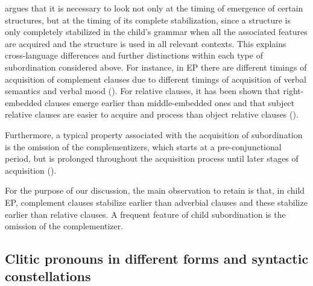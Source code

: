 \documentclass[output=paper]{langscibook}
\begin{document}
\citet{Armon-Lotem2005} argues that it is necessary to look not only at the timing of emergence of certain structures, but at the timing of its complete stabilization, since a structure is only completely stabilized in the child's grammar when all the associated features are acquired and the structure is used in all relevant contexts. This explains cross-language differences and further distinctions within each type of subordination considered above. For instance, in EP there are different timings of acquisition of complement clauses due to different timings of acquisition of verbal semantics and verbal mood (\citealt{JesusSantos2019}). For relative clauses, it has been shown that right-embedded clauses emerge earlier than middle-embedded ones \citep{Vasconcelos1995} and that subject relative clauses are easier to acquire and process than object relative clauses (\citealt{CostaSilva2011}).

Furthermore, a typical property associated with the acquisition of subordination is the omission of the complementizers, which starts at a pre-conjunctional period, but is prolonged throughout the acquisition process until later stages of acquisition (\citealt{Armon-Lotem2005, Soares1998}).

For the purpose of our discussion, the main observation to retain is that, in child EP, complement clauses stabilize earlier than adverbial clauses and these stabilize earlier than relative clauses. A frequent feature of child subordination is the omission of the complementizer.

\subsection{Clitic pronouns in different forms and syntactic constellations}\label{sec:rinke:3.2}
\end{document}

